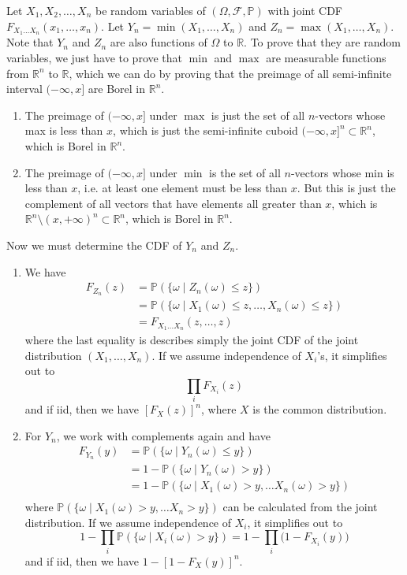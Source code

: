 \documentclass{article}
\theoremstyle{definition}
\theoremstyle{remark}
\theoremstyle{definition}
\begin{document}
Let $X_1, X_2, \ldots, X_n$ be random variables of $(\Omega, \mathcal{F}, \mathbb{P})$ with joint CDF $F_{X_1 \ldots X_n} (x_1, \ldots, x_n)$. Let $Y_n = \min (X_1, \ldots, X_n)$ and $Z_n = \max(X_1, \ldots, X_n)$. Note that $Y_n$ and $Z_n$ are also functions of $\Omega$ to $\mathbb{R}$. To prove that they are random variables, we just have to prove that $\min$ and $\max$ are measurable functions from $\mathbb{R}^n$ to $\mathbb{R}$, which we can do by proving that the preimage of all semi-infinite interval $(-\infty, x]$ are Borel in $\mathbb{R}^n$. 
\begin{enumerate}
    \item The preimage of $(-\infty, x]$ under $\max$ is just the set of all $n$-vectors whose max is less than $x$, which is just the semi-infinite cuboid $(-\infty, x]^n \subset \mathbb{R}^n$, which is Borel in $\mathbb{R}^n$. 
    \item The preimage of $(-\infty, x]$ under $\min$ is the set of all $n$-vectors whose min is less than $x$, i.e. at least one element must be less than $x$. But this is just the complement of all vectors that have elements all greater than $x$, which is $\mathbb{R}^n \setminus (x, +\infty)^n \subset \mathbb{R}^n$, which is Borel in $\mathbb{R}^n$. 
\end{enumerate}
Now we must determine the CDF of $Y_n$ and $Z_n$. 
\begin{enumerate}
    \item We have 
    \begin{align*}
        F_{Z_n} (z) & = \mathbb{P}(\{ \omega \mid Z_n (\omega) \leq z \}) \\
        & = \mathbb{P}(\{ \omega \mid X_1 (\omega) \leq z, \ldots, X_n (\omega) \leq z\}) \\
        & = F_{X_1 \ldots X_n} (z, \ldots, z)
    \end{align*}
    where the last equality is describes simply the joint CDF of the joint distribution $(X_1, \ldots, X_n)$. If we assume independence of $X_i$'s, it simplifies out to 
    \[\prod_{i} F_{X_i} (z)\]
    and if iid, then we have $[F_{X} (z) ]^n$, where $X$ is the common distribution. 
    \item For $Y_n$, we work with complements again and have 
    \begin{align*}
        F_{Y_n} (y) & = \mathbb{P}(\{ \omega \mid Y_n (\omega) \leq y \}) \\ 
        & = 1 - \mathbb{P}(\{ \omega \mid Y_n (\omega) > y \}) \\
        & = 1 - \mathbb{P}(\{ \omega \mid X_1 (\omega) > y, \ldots X_n (\omega) > y \}) \\
    \end{align*}
    where $\mathbb{P}(\{ \omega \mid X_1 (\omega) > y, \ldots X_n > y \})$ can be calculated from the joint distribution. If we assume independence of $X_i$, it simplifies out to 
    \[1 - \prod_{i} \mathbb{P}(\{\omega \mid X_i(\omega) > y \}) = 1 - \prod_{i} \big( 1 - F_{X_i} (y) \big)\]
    and if iid, then we have $1 - [1 - F_{X} (y)]^n$. 
\end{enumerate}
\end{document}
